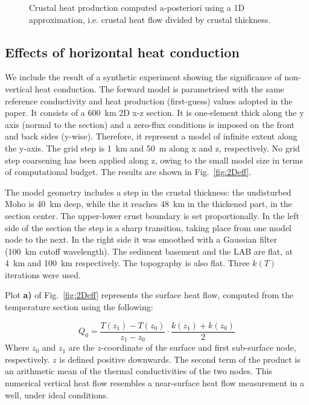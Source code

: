 {\begin{subappendices}
\begin{figure}
	\begin{adjustbox}{center}
	\end{adjustbox}
	\caption{Crustal heat production computed a-posteriori using a 1D approximation, i.e. crustal heat flow divided by crustal thickness.}
	\label{fig:AITN_A1D}
\end{figure}

\FloatBarrier

\subsection{Effects of horizontal heat conduction}
\label{ss:ApplSup:MethodTests:HorQ}

We include the result of a synthetic experiment showing the significance of non-vertical heat conduction.
The forward model is parametrised with the same reference conductivity and heat production (first-guess) values adopted in the paper.
It consists of a 600~km 2D x-z section.
It is one-element thick along the y axis (normal to the section) and a zero-flux conditions is imposed on the front and back sides (y-wise).
Therefore, it represent a model of infinite extent along the y-axis.
The grid step is 1~km and 50~m along x and z, respectively.
No grid step coarsening has been applied along z, owing to the small model size in terms of computational budget.
The results are shown in Fig.~\ref{fig:2Deff}.

The model geometry includes a step in the crustal thickness: the undisturbed Moho is 40~km deep, while the it reaches 48~km in the thickened part, in the section center.
The upper-lower crust boundary is set proportionally.
In the left side of the section the step is a sharp transition, taking place from one model node to the next.
In the right side it was smoothed with a Gaussian filter (100~km cutoff wavelength).
The sediment basement and the LAB are flat, at 4~km and 100~km respectively.
The topography is also flat.
Three $k(T)$ iterations were used.

Plot \textbf{a)} of Fig.~\ref{fig:2Deff} represents the surface heat flow, computed from the temperature section using the following:

\begin{equation}
    Q_0 = \frac{T(z_1) - T(z_0)}{z_1 - z_0} \cdot \frac{k(z_1) + k(z_0)}{2}
\label{eq:HF}
\end{equation}
Where $z_0$ and $z_1$ are the $z$-coordinate of the surface and first sub-surface node, respectively. $z$ is defined positive downwards.
The second term of the product is an arithmetic mean of the thermal conductivities of the two nodes.
This numerical vertical heat flow resembles a near-surface heat flow measurement in a well, under ideal conditions.


\end{subappendices}}
